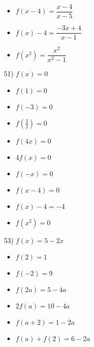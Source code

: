 \documentclass[12pt]{book}
\theoremstyle{definition}
\begin{document}
\begin{multicols}{3}
\begin{itemize}
\item  $f(x-4)=\dfrac{x-4}{x-5}$
\item $f(x) - 4=\dfrac{-3x+4}{x-1}$
\item  $f\left(x^2\right)=\dfrac{x^2}{x^2-1}$
\end{itemize}
\end{multicols}

51) $f(x)=0$
\begin{multicols}{3}
\begin{itemize}
\item $f(1)=0$
\item $f(-3)=0$
\item $f\left(\frac{3}{2} \right)=0$
\end{itemize}
\end{multicols}

\begin{multicols}{3}
\begin{itemize}
\item  $f(4x)=0$
\item $4f(x)=0$
\item $f(-x)=0$
\end{itemize}
\end{multicols}

\begin{multicols}{3}
\begin{itemize}
\item  $f(x-4)=0$
\item $f(x) - 4=-4$
\item  $f\left(x^2\right)=0$
\end{itemize}
\end{multicols}

53) $f(x)=5-2x$
\begin{multicols}{3}
\begin{itemize}
\item  $f(2)=1$
\item  $f(-2)=9$
\item  $f(2a)=5-4a$
\end{itemize}
\end{multicols}

\begin{multicols}{3}
\begin{itemize}
\item  $2 f(a)=10-4a$
\item $f(a+2)=1-2a$
\item $f(a) + f(2)=6-2a$
\end{itemize}
\end{multicols}
\end{document}
